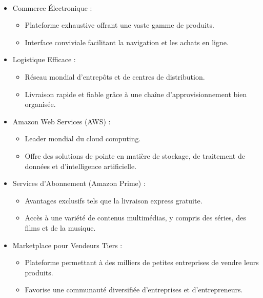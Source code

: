 \paragraph{}
\vspace{-2em}  %
\begin{itemize}
    \item Commerce Électronique :
    \begin{itemize}
        \item Plateforme exhaustive offrant une vaste gamme de produits.
        \item Interface conviviale facilitant la navigation et les achats en ligne.
    \end{itemize}

    \item Logistique Efficace :
    \begin{itemize} 
        \item Réseau mondial d'entrepôts et de centres de distribution.
        \item Livraison rapide et fiable grâce à une chaîne d'approvisionnement bien organisée.
    \end{itemize}

    \item Amazon Web Services (AWS) :
    \begin{itemize}
        \item Leader mondial du cloud computing.
        \item Offre des solutions de pointe en matière de stockage, de traitement de données et d'intelligence artificielle.
    \end{itemize}

    \item Services d'Abonnement (Amazon Prime) :
    \begin{itemize}
        \item Avantages exclusifs tels que la livraison express gratuite.
        \item Accès à une variété de contenus multimédias, y compris des séries, des films et de la musique.
    \end{itemize}

    \item Marketplace pour Vendeurs Tiers :
    \begin{itemize}
        \item Plateforme permettant à des milliers de petites entreprises de vendre leurs produits.
        \item Favorise une communauté diversifiée d'entreprises et d'entrepreneurs.
    \end{itemize}
\end{itemize}

